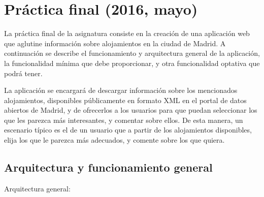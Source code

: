 \newpage

\section{Práctica final (2016, mayo)}
\label{practica-final-2016-05}

La práctica final de la asignatura consiste en la creación de una aplicación web que aglutine información sobre alojamientos en la ciudad de Madrid. A continuación se describe el funcionamiento y arquitectura general de la aplicación, la funcionalidad mínima que debe proporcionar, y otra funcionalidad optativa que podrá tener.

La aplicación se encargará de descargar información sobre los mencionados alojamientos, disponibles públicamente en formato XML en el portal de datos abiertos de Madrid, y de ofrecerlos a los usuarios para que puedan seleccionar los que les parezca más interesantes, y comentar sobre ellos. De esta manera, un escenario típico es el de un usuario que a partir de los alojamientos disponibles, elija los que le parezca más adecuados, y comente sobre los que quiera.

\subsection{Arquitectura y funcionamiento general}

Arquitectura general:

